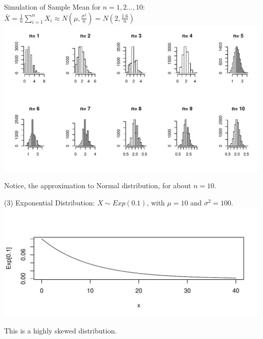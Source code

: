 \documentclass[t,xcolor=pdftex,dvipsnames,table]{beamer}\usepackage[]{graphicx}\usepackage[]{color}
\makeatletter
\def\maxwidth{ %
  \ifdim\Gin@nat@width>\linewidth
    \linewidth
  \else
    \Gin@nat@width
  \fi
}
\newenvironment{knitrout}{}{} %
\makeatother
\begin{document}
\begin{frame}{}

Simulation of Sample Mean for $n=1,2\ldots,10$: $\bar{X} = \frac{1}{n} \sum_{i=1}^{n} X_{i}  \approx N(\mu, \frac{\sigma^2}{n}) = N(2,\frac{1.6}{n})$  \\

\begin{knitrout}
\color{fgcolor}
\includegraphics[width=\maxwidth]{figure/unnamed-chunk-114-1} 

\end{knitrout}

Notice, the approximation to Normal distribution, for about $n=10$.
\end{frame}



\begin{frame}{}

(3) Exponential Distribution: $X \sim Exp(0.1)$, with $\mu=10$ and $\sigma^2=100$.  \\

\begin{knitrout}
\color{fgcolor}
\includegraphics[width=\maxwidth]{figure/unnamed-chunk-115-1} 

\end{knitrout}

This is a highly skewed distribution.
\end{frame}
\end{document}

